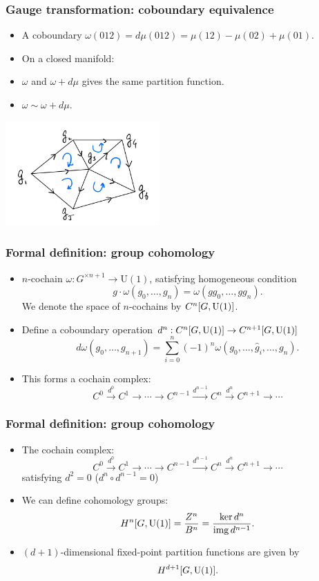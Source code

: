 \documentclass[xcolor=table, aspectratio=43,ignorenonframetext]{beamer}
\DeclareMathOperator{\img}{img}
\begin{document}
\begin{frame}
\frametitle{Gauge transformation: coboundary equivalence}
\begin{itemize}
	\item A coboundary $\omega(012)=d\mu(012)=\mu(12)-\mu(02)+\mu(01)$.
	\item On a \alert{closed} manifold:
	\item $\omega$ and $\omega + d\mu$ gives the same partition function.
	\item $\omega\sim\omega + d\mu$.
\end{itemize}
\begin{center}
\includegraphics[height=4cm]{tri-orient}
\end{center}
\end{frame}

\begin{frame}
\frametitle{Formal definition: group cohomology}
\begin{itemize}
	\item $n$-cochain $\omega: G^{\times n+1}\rightarrow \text{U}(1)$, satisfying homogeneous condition
	\[g\cdot\omega(g_0,\ldots,g_n) = \omega(gg_0,\ldots,gg_n).\]
	We denote the space of $n$-cochains by $C^n[G,\text U(1)]$.
	\item Define a coboundary operation $d^n:C^n[G,\text U(1)]\rightarrow C^{n+1}[G,\text U(1)]$
	\[d\omega(g_0,\ldots,g_{n+1})=\sum_{i=0}^n(-1)^n\omega(g_0,\ldots,\hat g_i,\ldots,g_n).\]
	\item This forms a cochain complex:
	\[C^0\xrightarrow{d^0}C^1\rightarrow\cdots\rightarrow C^{n-1}\xrightarrow{d^{n-1}}C^n\xrightarrow{d^n}C^{n+1}\rightarrow\cdots\]
\end{itemize}
\end{frame}

\begin{frame}
	\frametitle{Formal definition: group cohomology}
	\begin{itemize}
		\item The cochain complex:
		\[C^0\xrightarrow{d^0}C^1\rightarrow\cdots\rightarrow C^{n-1}\xrightarrow{d^{n-1}}C^n\xrightarrow{d^n}C^{n+1}\rightarrow\cdots\]
		satisfying $d^2=0$ ($d^n\circ d^{n-1}=0$)
		\item We can define cohomology groups:
		\[H^n[G,\text U(1)] = \frac{Z^n}{B^n} = \frac{\ker d^n}{\img d^{n-1}}.\]
		\item $(d+1)$-dimensional fixed-point partition functions are given by
		\[H^{d+1}[G,\text U(1)].\]
	\end{itemize}
\end{frame}
\end{document}
